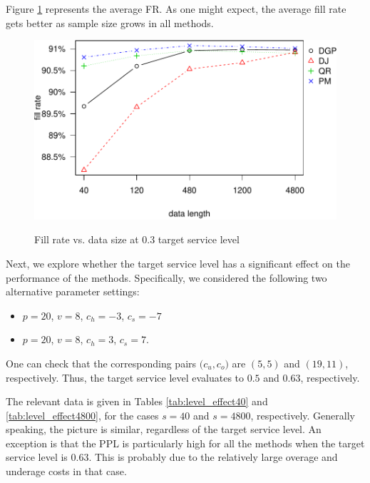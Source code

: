 \documentclass{article}
\begin{document}
Figure \ref{fig:fr0.3} represents the average FR. As one might expect, the average fill rate gets better as sample size grows in all methods. 


\begin{figure}[ht]
\centering
\caption{Fill rate vs. data size at 0.3 target service level}
\includegraphics{linear-norm-plot_files/figure-latex/fr-3.pdf}
\label{fig:fr0.3}
\end{figure}

Next, we explore whether the target service level has a significant effect on the performance of the methods. Specifically, we considered the following two alternative parameter settings:
\begin{itemize}
    \item $p=20$, $v=8$, $c_h=-3$, $c_s=-7$
    \item $p=20$, $v=8$, $c_h=3$, $c_s=7$.
\end{itemize}
One can check that the corresponding pairs $\big( c_u,c_o \big)$ are $(5,5)$ and $(19,11)$, respectively. Thus, the target service level evaluates to $0.5$ and $0.63$, respectively.

The relevant data is given in Tables \ref{tab:level_effect40} and \ref{tab:level_effect4800}, for the cases $s=40$
and $s=4800$, respectively. Generally speaking, the picture is similar, regardless of the target service level. An exception is that the PPL is particularly high for all the methods when the target service level is 0.63. This is probably due to the relatively large overage and underage costs in that case.
\end{document}
